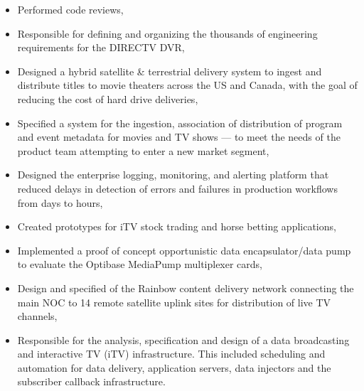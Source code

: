 \begin{itemize}
  \item Performed code reviews,
  \item Responsible for defining and organizing the thousands of engineering
    requirements for the DIRECTV DVR\@,
  \item Designed a hybrid satellite \& terrestrial delivery system to ingest and
    distribute titles to movie theaters across the US and Canada, with the goal
    of reducing the cost of hard drive deliveries,
  \item Specified a system for the ingestion, association of distribution of
    program and event metadata for movies and TV shows --- to meet the needs of
    the product team attempting to enter a new market segment,
  \item Designed the enterprise logging, monitoring, and alerting platform that
    reduced delays in detection of errors and failures in production workflows
    from days to hours,
  \item Created prototypes for iTV stock trading and horse betting applications,
  \item Implemented a proof of concept opportunistic data encapsulator/data pump
    to evaluate the Optibase MediaPump multiplexer cards,
  \item Design and specified of the Rainbow content delivery network connecting
    the main NOC to 14 remote satellite uplink sites for distribution of live TV
    channels,
  \item Responsible for the analysis, specification and design of a data
    broadcasting and interactive TV (iTV) infrastructure. This included
    scheduling and automation for data delivery, application servers, data
    injectors and the subscriber callback infrastructure.
\end{itemize}
